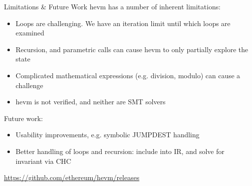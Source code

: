 \documentclass[aspectratio=169]{beamer}
\begin{document}
\begin{frame}[fragile=singleslide]{Limitations \& Future Work}
hevm has a number of inherent limitations:

\begin{itemize}
\item Loops are challenging. We have an iteration limit until which loops are examined
\item Recursion, and parametric calls can cause hevm to only partially explore the state
\item Complicated mathematical expressions (e.g. division, modulo) can cause a challenge
\item hevm is not verified, and neither are SMT solvers
\end{itemize}
\vspace{2ex}

Future work:
\begin{itemize}
\item Usability improvements, e.g. symbolic JUMPDEST handling
\item Better handling of loops and recursion: include into IR, and solve for invariant via CHC
\end{itemize}

\bigskip

\quad  {}
\qquad \url{https://github.com/ethereum/hevm/releases}

\end{frame}

%
%
%
%
\end{document}
